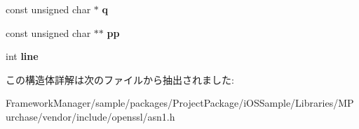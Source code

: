 \begin{DoxyCompactItemize}
\item 
\hypertarget{structasn1__const__ctx__st_a114e72fe35806cdb7846e39440450c76}{}const unsigned char $\ast$ {\bfseries q}\label{structasn1__const__ctx__st_a114e72fe35806cdb7846e39440450c76}

\item 
\hypertarget{structasn1__const__ctx__st_a576eca9e431bff6f31af32d0973ec700}{}const unsigned char $\ast$$\ast$ {\bfseries pp}\label{structasn1__const__ctx__st_a576eca9e431bff6f31af32d0973ec700}

\item 
\hypertarget{structasn1__const__ctx__st_acd270a3b54b4ec360447b76a44410943}{}int {\bfseries line}\label{structasn1__const__ctx__st_acd270a3b54b4ec360447b76a44410943}

\end{DoxyCompactItemize}


この構造体詳解は次のファイルから抽出されました\+:\begin{DoxyCompactItemize}
\item 
Framework\+Manager/sample/packages/\+Project\+Package/i\+O\+S\+Sample/\+Libraries/\+M\+Purchase/vendor/include/openssl/asn1.\+h\end{DoxyCompactItemize}
